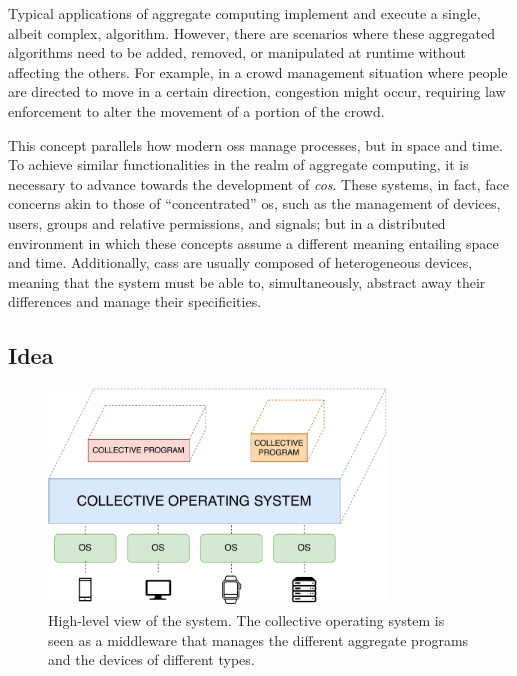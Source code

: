 \documentclass[12pt, a4paper]{article}
\begin{document}
Typical applications of aggregate computing implement and execute a single, albeit complex, algorithm.
%
However,
there are scenarios where these aggregated algorithms need to be added, removed,
or manipulated at runtime without affecting the others.
%
For example,
in a crowd management situation where people are directed to move in a certain direction,
congestion might occur,
requiring law enforcement to alter the movement of a portion of the crowd.

This concept parallels how modern \acp{os} manage processes, but in space and time.
%
To achieve similar functionalities in the realm of aggregate computing,
it is necessary to advance towards the development of \emph{\ac{cos}}.
%
These systems, in fact,
face concerns akin to those of ``concentrated'' \ac{os},
such as the management of devices, users, groups and relative permissions, and signals;
but in a distributed environment in which these concepts assume a different meaning
entailing space and time.
%
Additionally,
\acp{cas} are usually composed of heterogeneous devices,
meaning that the system must be able to,
simultaneously,
abstract away their differences and manage their specificities.

\subsection{Idea}
\label{subsec:idea}

\begin{figure}
    \centering
    \includegraphics[width=0.8\textwidth]{figures/system}
    \caption{
        High-level view of the system.
        The collective operating system is seen as a middleware that manages the different aggregate programs and the devices
        of different types.
    }\label{fig:system}
\end{figure}
\end{document}
